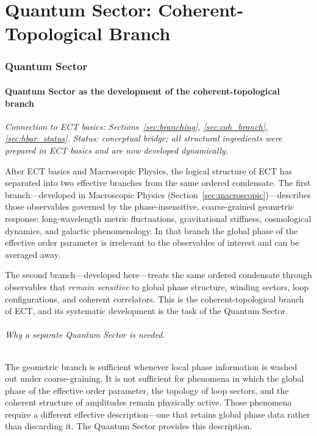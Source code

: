 \documentclass[11pt,a4paper]{article}
\numberwithin{equation}{section}
\begin{document}
\part{Quantum Sector: Coherent-Topological Branch}
\label{part:quantum}

\section{Quantum Sector}
\label{sec:quantum}


\subsection{Quantum Sector as the development of the
coherent-topological branch}
\label{sec:qs_intro}
\label{sec:emergent_principles}

\textit{Connection to ECT basics:
Sections~\ref{sec:branching}, \ref{sec:coh_branch},
\ref{sec:hbar_status}.
Status: conceptual bridge; all structural ingredients were
prepared in ECT basics and are now developed dynamically.}

\medskip
After ECT basics and Macroscopic Physics, the logical structure
of ECT has separated into two effective branches from the same
ordered condensate.
The first branch---developed in Macroscopic Physics
(Section~\ref{sec:macroscopic})---describes those observables
governed by the phase-insensitive, coarse-grained geometric
response: long-wavelength metric fluctuations, gravitational
stiffness, cosmological dynamics, and galactic phenomenology.
In that branch the global phase of the effective order parameter
is irrelevant to the observables of interest and can be averaged away.

The second branch---developed here---treats the same ordered
condensate through observables that \emph{remain sensitive} to
global phase structure, winding sectors, loop configurations,
and coherent correlators.
This is the coherent-topological branch of ECT, and its systematic
development is the task of the Quantum Sector.

\paragraph{Why a separate Quantum Sector is needed.}
The geometric branch is sufficient whenever local phase information
is washed out under coarse-graining.
It is not sufficient for phenomena in which the global phase of
the effective order parameter, the topology of loop sectors, and the
coherent structure of amplitudes remain physically active.
Those phenomena require a different effective description---one that
retains global phase data rather than discarding it.
The Quantum Sector provides this description.
\end{document}

